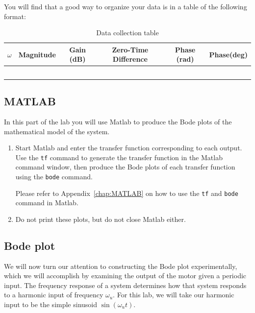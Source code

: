 You will find that a good way to organize your data is in a table of the
following format:

\begin{table}[htbp]
\centering
\begin{tabular}{|c|c|c|c|c|c|}\hline
$\omega$&Magnitude&Gain (dB)&Zero-Time Difference&
Phase (rad)&Phase(deg)\\\hline
&&&&&\\
&&&&&\\
&&&&&\\
&&&&&\\
&&&&&\\
\hline

\end{tabular}
\caption{Data collection table}
\label{tab:Data}
\end{table}%



\subsection{MATLAB}

In this part of the lab you will use \textsf{Matlab} to produce the Bode
plots of the mathematical model of the system.

\begin{enumerate}
\item Start \textsf{Matlab} and enter the transfer function corresponding to
each output.  Use the \verb|tf| command to generate the transfer function in
the \textsf{Matlab} command window, then produce the Bode plots of each
transfer function using the \verb|bode| command.

Please refer to Appendix~\ref{chap:MATLAB} on how to use the
\verb|tf| and \verb|bode| command in \textsf{Matlab}.
\item Do not print these plots, but do not close \textsf{Matlab} either.
\end{enumerate}

\subsection{Bode plot}

We will now turn our attention to constructing the Bode plot experimentally,
which we will accomplish by examining the output of the motor given a
periodic input.  The frequency response of a system determines how that
system responds to a harmonic input of frequency $\omega_u$\@.  For this lab,
we will take our harmonic input to be the simple sinusoid $\sin(\omega_u t)$\@.

